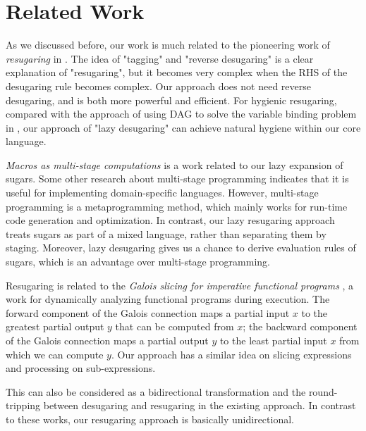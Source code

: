 \section{Related Work}
\label{sec6}

As we discussed before, our work is much related to the pioneering work of \emph{resugaring} in \cite{resugaring}. The idea of "tagging" and "reverse desugaring" is a clear explanation of "resugaring", but it becomes very complex when the RHS of the desugaring rule becomes complex. Our approach does not need reverse desugaring, and is both more powerful and efficient.
For hygienic resugaring, compared with the approach of using DAG to solve the variable binding problem in \cite{hygienic}, our approach of "lazy desugaring" can achieve natural hygiene within our core language.

\emph{Macros as multi-stage computations} \cite{multistage} is a work related to our lazy expansion of sugars. Some other research \cite{modularstaging} about multi-stage programming \cite{MSP} indicates that it is useful for implementing domain-specific languages. However, multi-stage programming is a metaprogramming method, which mainly works for run-time code generation and optimization. In contrast, our lazy resugaring approach treats sugars as part of a mixed language, rather than separating them by staging. Moreover, lazy desugaring gives us a chance to derive evaluation rules of sugars, which is an advantage over multi-stage programming.





Resugaring is related to the \emph{Galois slicing for imperative functional programs} \cite{slicing}, a work for dynamically analyzing functional programs during execution. The forward component of the Galois connection maps a partial input $x$ to the greatest partial output $y$ that can be computed from $x$; the backward component of the Galois connection maps a partial output $y$ to the least partial input $x$ from which we can compute $y$.
Our approach has a similar idea on slicing expressions and processing on sub-expressions.

This can also be considered as a bidirectional transformation \cite{bx,lens07} and the round-tripping between desugaring and resugaring in the existing approach. In contrast to these works, our resugaring approach is basically unidirectional. 


